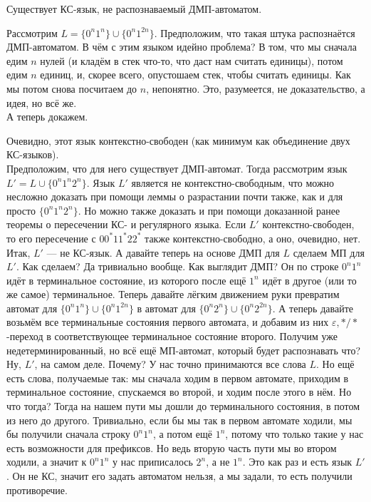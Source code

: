\documentclass{article}
\begin{document}
\begin{itemize}
\begin{Proof}
        \end{Proof}
        \thm Существует КС-язык, не распознаваемый ДМП-автоматом.
        \begin{Example}
            Рассмотрим $L=\{0^n1^n\}\cup\{0^n1^{2n}\}$. Предположим, что такая штука распознаётся ДМП-автоматом. В чём с этим языком идейно проблема? В том, что мы сначала едим $n$ нулей (и кладём в стек что-то, что даст нам считать единицы), потом едим $n$ единиц, и, скорее всего, опустошаем стек, чтобы считать единицы. Как мы потом снова посчитаем до $n$, непонятно. Это, разумеется, не доказательство, а идея, но всё же.\\
            А теперь докажем.
            \begin{Proof}
                Очевидно, этот язык контекстно-свободен (как минимум как объединение двух КС-языков).\\
                Предположим, что для него существует ДМП-автомат. Тогда рассмотрим язык $L'=L\cup\{0^n1^n2^n\}$. Язык $L'$ является не контекстно-свободным, что можно несложно доказать при помощи леммы о разрастании почти также, как и для просто $\{0^n1^n2^n\}$. Но можно также доказать и при помощи доказанной ранее теоремы о пересечении КС- и регулярного языка. Если $L'$ контекстно-свободен, то его пересечение с $00^*11^*22^*$ также контекстно-свободно, а оно, очевидно, нет.\\
                Итак, $L'$ --- не КС-язык. А давайте теперь на основе ДМП для $L$ сделаем МП для $L'$. Как сделаем? Да тривиально вообще. Как выглядит ДМП? Он по строке $0^n1^n$ идёт в терминальное состояние, из которого после ещё $1^n$ идёт в другое (или то же самое) терминальное. Теперь давайте лёгким движением руки превратим автомат для $\{0^n1^n\}\cup\{0^n1^{2n}\}$ в автомат для $\{0^n2^n\}\cup\{0^n2^{2n}\}$. А теперь давайте возьмём все терминальные состояния первого автомата, и добавим из них $\varepsilon,*/*$-переход в соответствующее терминальное состояние второго. Получим уже недетерминированный, но всё ещё МП-автомат, который будет распознавать что? Ну, $L'$, на самом деле. Почему? У нас точно принимаются все слова $L$. Но ещё есть слова, получаемые так: мы сначала ходим в первом автомате, приходим в терминальное состояние, спускаемся во второй, и ходим после этого в нём. Но что тогда? Тогда на нашем пути мы дошли до терминального состояния, в потом из него до другого. Тривиально, если бы мы так в первом автомате ходили, мы бы получили сначала строку $0^n1^n$, а потом ещё $1^n$, потому что только такие у нас есть возможности для префиксов. Но ведь вторую часть пути мы во втором ходили, а значит к $0^n1^n$ у нас приписалось $2^n$, а не $1^n$. Это как раз и есть язык $L'$. Он не КС, значит его задать автоматом нельзя, а мы задали, то есть получили противоречие.

\end{Proof}
\end{Example}
\end{itemize}
\end{document}
